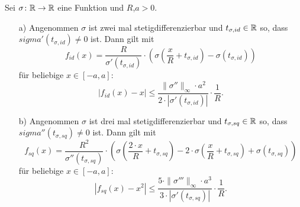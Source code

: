 \begin{lem}
  \label{lem:1}
  Sei $\sigma \colon \mathbb{R} \to \mathbb{R}$ eine Funktion und $R$,$a > 0$.
  \begin{itemize}
  \item[a)] Angenommen $\sigma$ ist zwei mal stetigdifferenzierbar und $t_{\sigma,id} \in \mathbb{R}$ so, dass $sigma'(t_{\sigma, id}) \neq 0$ ist. Dann gilt mit
  $$ f_{id}(x) = \frac{R}{\sigma'(t_{\sigma, id})} \cdot \left(\sigma\left(\frac{x}{R} + t_{\sigma, id}\right) - \sigma(t_{\sigma, id})\right)$$
  für beliebige $x \in [-a, a]\colon$ 
  $$ |f_{id}(x) - x| \leq \frac{\|\sigma''\|_{\infty} \cdot a^2}{2 \cdot |\sigma'(t_{\sigma, id})|} \cdot \frac{1}{R}.$$
  \item[b)] Angenommen $\sigma$ ist drei mal stetigdifferenzierbar und $t_{\sigma,sq} \in \mathbb{R}$ so, dass $sigma''(t_{\sigma, sq}) \neq 0$ ist. Dann gilt mit
  $$ f_{sq}(x) = \frac{R^2}{\sigma''(t_{\sigma, sq})} \cdot \left(\sigma\left(\frac{2 \cdot x}{R} + t_{\sigma, sq}\right) - 2 \cdot \sigma(\frac{x}{R} + t_{\sigma, sq})+ \sigma(t_{\sigma, sq})\right)$$
  für beliebige $x \in [-a, a]\colon$ 
  $$ |f_{sq}(x) - x^2| \leq \frac{5 \cdot \|\sigma'''\|_{\infty} \cdot a^3}{3 \cdot |\sigma'(t_{\sigma, sq})|} \cdot \frac{1}{R}.$$
  \end{itemize}
\end{lem}
